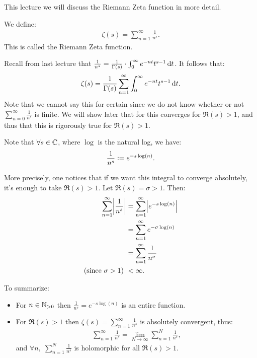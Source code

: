 \setcounter{section}{0}
\setcounter{theorem}{0}

This lecture we will discuss the Riemann Zeta function in more detail.

\begin{definition}
We define:
\begin{align*}
    \zeta(s) = \sum_{n=1}^\infty \frac{1}{n^s}.
\end{align*}
This is called the Riemann Zeta function.

\end{definition}

\begin{remark}\label{rem:r-sum-expression}
Recall from last lecture that $\frac{1}{n^s} = \frac{1}{\Gamma(s) } \cdot \int_0^\infty e^{-nt} t^{s-1} \dif t$. It follows that:
\begin{align*}
    \zeta(s) = \frac{1}{\Gamma(s) } \sum_{n=1}^\infty \int_0^\infty e^{-nt} t^{s-1} \dif t.
\end{align*}
Note that we cannot say this for certain since we do not know whether or not $\sum_{n=0}^\infty \frac{1}{n^s}$ is finite. We will show later that for this converges for $\Re(s) >1$, and thus that this is rigorously true for $\Re(s) >1$.
\end{remark}

 Note that $\forall s \in \mathbb{C}$, where $\log$ is the natural log, we have:
\begin{align*}
    \frac{1}{n^s} \vcentcolon = e^{- s \log(n)}.
\end{align*}

More precisely, one notices that if we want this integral to converge absolutely, it's enough to take $\Re(s) > 1$. Let $\Re(s) = \sigma > 1$. Then:
\begin{align*}
    \sum_{n=1}^\infty \abs{\frac{1}{n^s}} &= \sum_{n=1}^\infty \abs{e^{-s \log(n)}}\\
    &= \sum_{n=1}^\infty e^{- \sigma \log(n)}\\ &= \sum_{n=1}^\infty \frac{1}{n^\sigma}\\ \text{(since $\sigma > 1$) } &< \infty.
\end{align*}

To summarize:
\begin{itemize}
    \item For $n \in \mathbb{N}_{>0}$ then $\frac{1}{n^s} = e^{- s \log (n)}$ is an entire function.
    \item For $\Re(s) > 1$ then $\zeta(s) = \sum_{n=1}^\infty \frac{1}{n^s}$ is absolutely convergent, thus:
    \begin{align*}
        \sum_{n=1}^\infty \frac{1}{n^s} = \lim_{N \to \infty} \sum_{n=1}^N \frac{1}{n^s},
    \end{align*}
    and $\forall n, \; \sum_{n=1}^N \frac{1}{n^s}$ is holomorphic for all $\Re(s) >1$.
\end{itemize}

